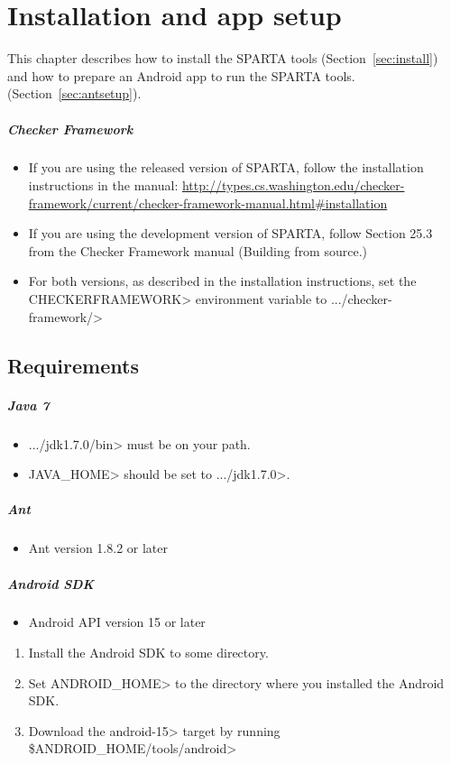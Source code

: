 \htmlhr
\chapter{Installation and app setup\label{installation}}
This chapter describes how to install the SPARTA tools
(Section~\ref{sec:install}) and how to prepare an Android app to run the
SPARTA tools. (Section~\ref{sec:antsetup}).

\paragraph{Checker Framework}
\begin{itemize}
\item If you are using the released version of SPARTA, follow the installation instructions in the manual: 
\url{http://types.cs.washington.edu/checker-framework/current/checker-framework-manual.html#installation}
\item If you are using the development version of SPARTA,  follow Section 25.3 from the Checker Framework manual (Building from source.)
\item  For both versions, as described in the installation instructions, set the \<CHECKERFRAMEWORK>
  environment variable to \<.../checker-framework/>
\end{itemize}

\section {Requirements\label{sec:requirements}}
\paragraph{Java 7}
\begin{itemize}
 \item  \<.../jdk1.7.0/bin> must be on your path.
 \item \<JAVA\_HOME> should be set to \<.../jdk1.7.0>.
\end{itemize}

\paragraph{Ant}
\begin{itemize}
 \item Ant version 1.8.2 or later
\end{itemize}

\paragraph{Android SDK}
\begin{itemize}
 \item Android API version 15 or later
\end{itemize}
\begin{enumerate}
 \item Install the Android SDK to some directory. 
 \item Set \<ANDROID\_HOME> to the directory where you installed the
   Android SDK.
 \item Download the \<android-15> target by running \<\$ANDROID\_HOME/tools/android>
\end{enumerate}

